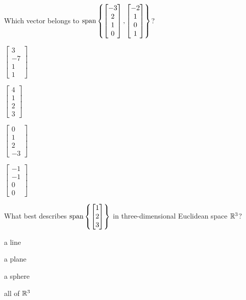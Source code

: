 \documentclass{article}
\begin{document}
\begin{readinessAssuranceTest}
\item Which vector belongs to \(\operatorname{span}\left\{
\begin{bmatrix}
  -3 \\ 2 \\ 1 \\ 0
\end{bmatrix},
\begin{bmatrix}
  -2 \\ 1 \\ 0 \\ 1
\end{bmatrix}
\right\}\)?
  \begin{multicols}{4}
  \begin{readinessAssuranceTestChoices}
    \item \(
    \begin{bmatrix}
      3 \\ -7 \\ 1 \\ 1
    \end{bmatrix}
    \)
    \item \(
    \begin{bmatrix}
      4 \\ 1 \\ 2 \\ 3
    \end{bmatrix}
    \)
    \item \(
    \begin{bmatrix}
      0 \\ 1 \\ 2 \\ -3
    \end{bmatrix}
    \) %
    \item \(
    \begin{bmatrix}
      -1 \\ -1 \\ 0 \\ 0
    \end{bmatrix}
    \)
  \end{readinessAssuranceTestChoices}
  \end{multicols}

\vspace{1in}

\item What best describes \(\operatorname{span}\left\{
\begin{bmatrix}
  1 \\ 2 \\ 3
\end{bmatrix}\right\}\) in three-dimensional Euclidean space \(\mathbb{R}^3\)?
  \begin{multicols}{4}
  \begin{readinessAssuranceTestChoices}
    \item a line %
    \item a plane
    \item a sphere
    \item all of \(\mathbb{R}^3\)
  \end{readinessAssuranceTestChoices}
  \end{multicols}



\end{readinessAssuranceTest}
\end{document}
